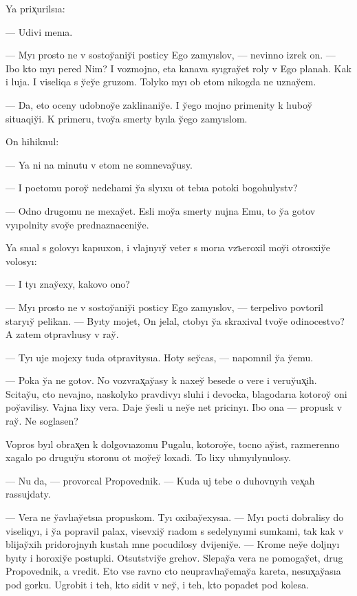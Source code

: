 \documentclass[10pt]{book}
\begin{document}
Ya prix̨urilsıa:

— Udivi menıa.

— Myı prosto ne v sostoy̆aniy̆i posticy Ego zamyıslov, — nevinno izrek on. — Ibo kto myı pered Nim? I vozmojno, eta kanava syıgray̆et roly v Ego planah. Kak i luja. I viseliqa s y̆ey̆e gruzom. Tolyko myı ob etom nikogda ne uznay̆em.

— Da, eto oceny udobnoy̆e zaklinaniy̆e. I y̆ego mojno primenity k lıuboy̆ situaqiy̆i. K primeru, tvoy̆a smerty byıla y̆ego zamyıslom.

On hihiknul:

— Ya ni na minutu v etom ne somnevay̆usy.

— I poetomu poroy̆ nedelıami y̆a slyıxu ot tebıa potoki bogohulystv?

— Odno drugomu ne mexay̆et. Esli moy̆a smerty nujna Emu, to y̆a gotov vyıpolnity svoy̆e prednaznaceniy̆e.

Ya snıal s golovyı kapıuxon, i vlajnyıy̆ veter s morıa vzъeroxil moy̆i otrosxiy̆e volosyı:

— I tyı znay̆exy, kakovo ono?

— Myı prosto ne v sostoy̆aniy̆i posticy Ego zamyıslov, — terpelivo povtoril staryıy̆ pelikan. — Byıty mojet, On jelal, ctobyı y̆a skraxival tvoy̆e odinocestvo? A zatem otpravlıusy v ray̆.

— Tyı uje mojexy tuda otpravitysıa. Hoty sey̆cas, — napomnil y̆a y̆emu.

— Poka y̆a ne gotov. No vozvrax̨ay̆asy k naxey̆ besede o vere i veruy̆ux̨ih. Scitay̆u, cto nevajno, naskolyko pravdivyı sluhi i devocka, blagodarıa kotoroy̆ oni poy̆avilisy. Vajna lixy vera. Daje y̆esli u ney̆e net pricinyı. Ibo ona — propusk v ray̆. Ne soglasen?

Vopros byıl obrax̨en k dolgovıazomu Pugalu, kotoroy̆e, tocno ay̆ist, razmerenno xagalo po druguy̆u storonu ot moy̆ey̆ loxadi. To lixy uhmyılynulosy.

— Nu da, — provorcal Propovednik. — Kuda uj tebe o duhovnyıh vex̨ah rassujdaty.

— Vera ne y̆avlıay̆etsıa propuskom. Tyı oxibay̆exysıa. — Myı pocti dobralisy do viseliqyı, i y̆a popravil palax, visevxiy̆ rıadom s sedelynyımi sumkami, tak kak v blijay̆xih pridorojnyıh kustah mne pocudilosy dvijeniy̆e. — Krome ney̆e doljnyı byıty i horoxiy̆e postupki. Otsutstviy̆e grehov. Slepay̆a vera ne pomogay̆et, drug Propovednik, a vredit. Eto vse ravno cto neupravlıay̆emay̆a kareta, nesux̨ay̆asıa pod gorku. Ugrobit i teh, kto sidit v ney̆, i teh, kto popadet pod kolesa.
\end{document}
